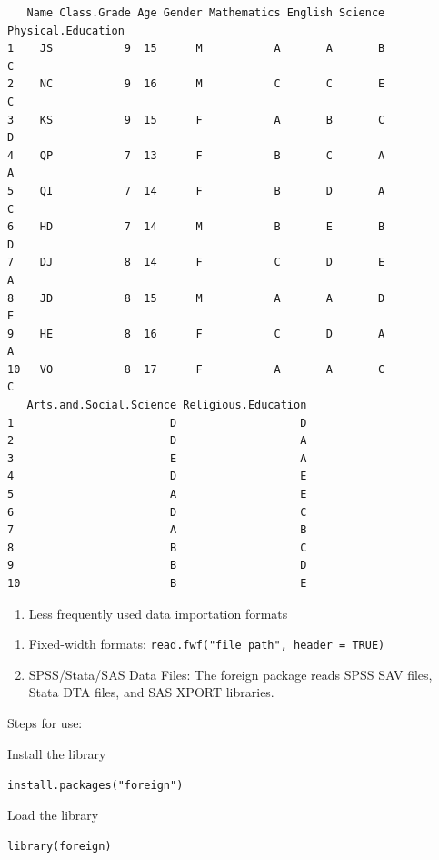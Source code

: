 \documentclass[
  letterpaper,
  DIV=11,
  numbers=noendperiod]{scrreprt}
\providecommand{\tightlist}{%
  \setlength{\itemsep}{0pt}\setlength{\parskip}{0pt}}\usepackage{longtable,booktabs,array}
\begin{document}
\begin{verbatim}
   Name Class.Grade Age Gender Mathematics English Science Physical.Education
1    JS           9  15      M           A       A       B                  C
2    NC           9  16      M           C       C       E                  C
3    KS           9  15      F           A       B       C                  D
4    QP           7  13      F           B       C       A                  A
5    QI           7  14      F           B       D       A                  C
6    HD           7  14      M           B       E       B                  D
7    DJ           8  14      F           C       D       E                  A
8    JD           8  15      M           A       A       D                  E
9    HE           8  16      F           C       D       A                  A
10   VO           8  17      F           A       A       C                  C
   Arts.and.Social.Science Religious.Education
1                        D                   D
2                        D                   A
3                        E                   A
4                        D                   E
5                        A                   E
6                        D                   C
7                        A                   B
8                        B                   C
9                        B                   D
10                       B                   E
\end{verbatim}

\begin{enumerate}
\def\labelenumi{\arabic{enumi}.}
\setcounter{enumi}{1}
\tightlist
\item
  Less frequently used data importation formats
\end{enumerate}

\begin{enumerate}
\def\labelenumi{\alph{enumi}.}
\item
  Fixed-width formats: \texttt{read.fwf("file\ path",\ header\ =\ TRUE)}
\item
  SPSS/Stata/SAS Data Files: The foreign package reads SPSS SAV files,
  Stata DTA files, and SAS XPORT libraries.
\end{enumerate}

Steps for use:

Install the library

\texttt{install.packages("foreign")}

Load the library

\texttt{library(foreign)}
\end{document}
